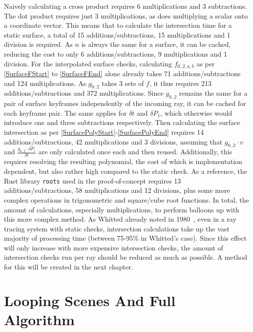Naively calculating a cross product requires 6 multiplications and 3 subtractions.
The dot product requires just 3 multiplications, as does multiplying a scalar onto a coordinate vector.
This means that to calculate the intersection time for a static surface,
a total of 15 additions/subtractions, 15 multiplications and 1 division is required.
As \(n\) is always the same for a surface, it can be cached,
reducing the cost to only 6 additions/subtractions, 9 multiplications and 1 division.
\newline
For the interpolated surface checks, calculating \(f_{0..2, a, b}\) as per \eqref{SurfaceFStart} to \eqref{SurfaceFEnd}
alone already takes 71 additions/subtractions and 124 multiplications.
As \(g_{0..2}\) takes 3 sets of \(f\), it thus requires 213 additions/subtractions and 372 multiplications.
Since \(g_{0..2}\) remains the same for a pair of surface keyframes independently of the incoming ray,
it can be cached for each keyframe pair. The same applies for \(\delta t\) and \(\delta P_1\),
which otherwise would introduce one and three subtractions respectively.
\newline
Then calculating the surface intersection as per \eqref{SurfacePolyStart}-\eqref{SurfacePolyEnd}
requires 14 additions/subtractions, 42 multiplications and 3 divisions,
assuming that \(g_{0..2} \cdot v\) and \(\frac{g_{0..2} \cdot \delta P_1}{\delta t}\)
are only calculated once each and then reused.
\newline
Additionally, this requires resolving the resulting polynomial,
the cost of which is implementation dependent, but also rather high compared to the static check.
As a reference, the Rust library \verb|roots| used in the proof-of-concept requires 13 additions/subtractions,
58 multiplications and 12 divisions, plus some more complex operations in trigonometric and square/cube root functions.
\newline
In total, the amount of calculations, especially multiplications, to perform balloons up with this more complex method.
As Whitted already noted in 1980~\cite{Wh80}, even in a ray tracing system with static checks,
intersection calculations take up the vast majority of processing time (between 75-95\% in Whitted's case).
Since this effect will only increase with more expensive intersection checks,
the amount of intersection checks run per ray should be reduced as much as possible.
A method for this will be created in the next chapter.

\section{Looping Scenes And Full Algorithm}

